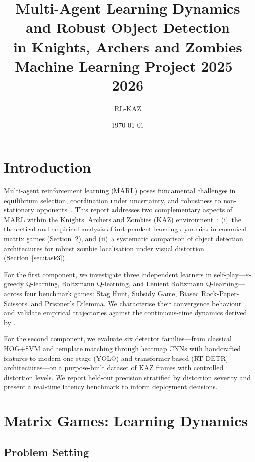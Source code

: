 \documentclass[11pt,a4paper]{article}
\title{\textbf{Multi-Agent Learning Dynamics and Robust Object Detection\\in Knights, Archers and Zombies}\\[0.35em]
\large Machine Learning Project 2025--2026}
\author{RL-KAZ}
\date{\today}
\begin{document}
\maketitle
\tableofcontents
\newpage

\section{Introduction}
\label{sec:intro}

Multi-agent reinforcement learning (MARL) poses fundamental challenges in equilibrium selection, coordination under uncertainty, and robustness to non-stationary opponents~\citep{hernandez2019marl,tuyls2012}. This report addresses two complementary aspects of MARL within the Knights, Archers and Zombies (KAZ) environment~\citep{terry2021pettingzoo,pettingzoo_kaz}: (i)~the theoretical and empirical analysis of independent learning dynamics in canonical matrix games (Section~\ref{sec:task2}), and (ii)~a systematic comparison of object detection architectures for robust zombie localisation under visual distortion (Section~\ref{sec:task3}).

For the first component, we investigate three independent learners in self-play---$\varepsilon$-greedy Q-learning, Boltzmann Q-learning, and Lenient Boltzmann Q-learning---across four benchmark games: Stag Hunt, Subsidy Game, Biased Rock-Paper-Scissors, and Prisoner's Dilemma. We characterise their convergence behaviour and validate empirical trajectories against the continuous-time dynamics derived by \citet{bloembergen2015}.

For the second component, we evaluate six detector families---from classical HOG+SVM and template matching through heatmap CNNs with handcrafted features to modern one-stage (YOLO) and transformer-based (RT-DETR) architectures---on a purpose-built dataset of KAZ frames with controlled distortion levels. We report held-out precision stratified by distortion severity and present a real-time latency benchmark to inform deployment decisions.

\section{Matrix Games: Learning Dynamics}
\label{sec:task2}

\subsection{Problem Setting}
\label{sec:task2_setting}
\end{document}
